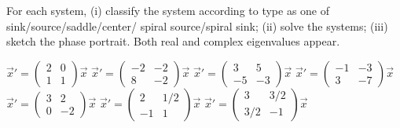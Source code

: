 \documentclass{ximera}
\begin{document}
\begin{exercise}%
    For each system, (i) classify the system according to type as one of sink/source/saddle/center/ spiral source/spiral sink; (ii) solve the systems; (iii) sketch the phase portrait. Both real and complex eigenvalues appear. %
    \begin{multicols}{2}
        \begin{tasks}
            \task $\vec{x}'=\begin{pmatrix} 2&0 \\ 1&1 \end{pmatrix}\vec{x}$ %
            \task $\vec{x}'=\begin{pmatrix} -2& -2\\ 8& -2\end{pmatrix}\vec{x}$ %
            \task $\vec{x}'=\begin{pmatrix} 3& 5\\ -5& -3  \end{pmatrix}\vec{x}$ %
            \task $\vec{x}' = \begin{pmatrix} -1 & -3 \\ 3 & -7 \end{pmatrix}\vec{x}$ %
            \task $\vec{x}'=\begin{pmatrix} 3& 2\\ 0&-2 \end{pmatrix}\vec{x}$ %
            \task $\vec{x}'=\begin{pmatrix} 2& 1/2 \\-1 & 1  \end{pmatrix}\vec{x}$ %
            \task $\vec{x}'=\begin{pmatrix} 3& 3/2\\ 3/2 & -1 \end{pmatrix}\vec{x}$ %
        \end{tasks}
    \end{multicols}
\end{exercise}
\end{document}
